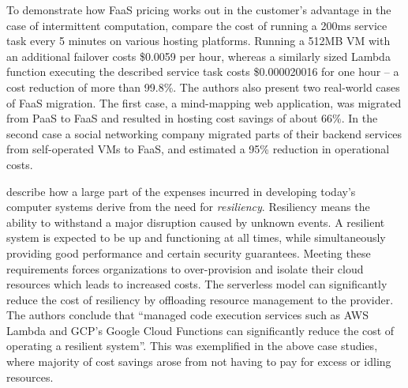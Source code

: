 To demonstrate how FaaS pricing works out in the customer's advantage in the case of intermittent computation, \textcite{adzic2017serverless} compare the cost of running a 200ms service task every 5 minutes on various hosting platforms. Running a 512MB VM with an additional failover costs \$0.0059 per hour, whereas a similarly sized Lambda function executing the described service task costs \$0.000020016 for one hour -- a cost reduction of more than 99.8\%. The authors also present two real-world cases of FaaS migration. The first case, a mind-mapping web application, was migrated from PaaS to FaaS and resulted in hosting cost savings of about 66\%. In the second case a social networking company migrated parts of their backend services from self-operated VMs to FaaS, and estimated a 95\% reduction in operational costs.

\textcite{wagner16resilient} describe how a large part of the expenses incurred in developing today's computer systems derive from the need for \textit{resiliency}. Resiliency means the ability to withstand a major disruption caused by unknown events. A resilient system is expected to be up and functioning at all times, while simultaneously providing good performance and certain security guarantees. Meeting these requirements forces organizations to over-provision and isolate their cloud resources which leads to increased costs. The serverless model can significantly reduce the cost of resiliency by offloading resource management to the provider. The authors conclude that ``managed code execution services such as AWS Lambda and GCP’s Google Cloud Functions can significantly reduce the cost of operating a resilient system''. This was exemplified in the above case studies, where majority of cost savings arose from not having to pay for excess or idling resources.

